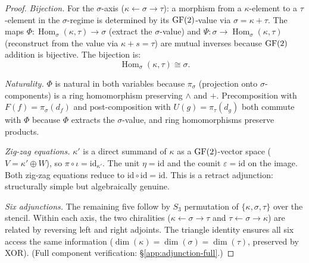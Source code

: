 \begin{proof}
\emph{Bijection.}
For the $\sigma$-axis ($\kappa \leftarrow \sigma \to \tau$):
a morphism from a $\kappa$-element to a $\tau$-element in
the $\sigma$-regime is determined by its $\operatorname{GF}(2)$-value
via $\sigma = \kappa + \tau$. The maps
$\Phi: \operatorname{Hom}_\sigma(\kappa, \tau) \to \sigma$
(extract the $\sigma$-value) and
$\Psi: \sigma \to \operatorname{Hom}_\sigma(\kappa, \tau)$
(reconstruct from the value via $\kappa + s = \tau$) are
mutual inverses because $\operatorname{GF}(2)$ addition is bijective.
The bijection is:
\begin{equation}\label{eq:triadic-adj}
  \operatorname{Hom}_\sigma(\kappa, \tau) \cong \sigma.
\end{equation}

\emph{Naturality.}
$\Phi$ is natural in both variables because
$\pi_\sigma$ (projection onto $\sigma$-components) is a
ring homomorphism preserving $\wedge$ and $+$.
Precomposition with $F(f) = \pi_\sigma(d_f)$ and
post-composition with $U(g) = \pi_\tau(d_g)$ both
commute with $\Phi$ because $\Phi$ extracts the
$\sigma$-value, and ring homomorphisms preserve
products.

\emph{Zig-zag equations.}
$\kappa'$ is a direct summand of $\kappa$ as a
$\operatorname{GF}(2)$-vector space ($V = \kappa' \oplus W$), so
$\pi \circ \iota = \mathrm{id}_{\kappa'}$. The unit
$\eta = \mathrm{id}$ and the counit $\varepsilon =
\mathrm{id}$ on the image. Both zig-zag equations
reduce to $\mathrm{id} \circ \mathrm{id} = \mathrm{id}$.
This is a retract adjunction: structurally simple but
algebraically genuine.

\emph{Six adjunctions.}
The remaining five follow by $S_3$ permutation of
$\{\kappa, \sigma, \tau\}$ over the stencil. Within
each axis, the two chiralities ($\kappa \leftarrow
\sigma \to \tau$ and $\tau \leftarrow \sigma \to \kappa$)
are related by reversing left and right adjoints. The
triangle identity ensures all six access the same
information ($\dim(\kappa) = \dim(\sigma) = \dim(\tau)$,
preserved by XOR). (Full component verification: \S\ref{app:adjunction-full}.)
\end{proof}

